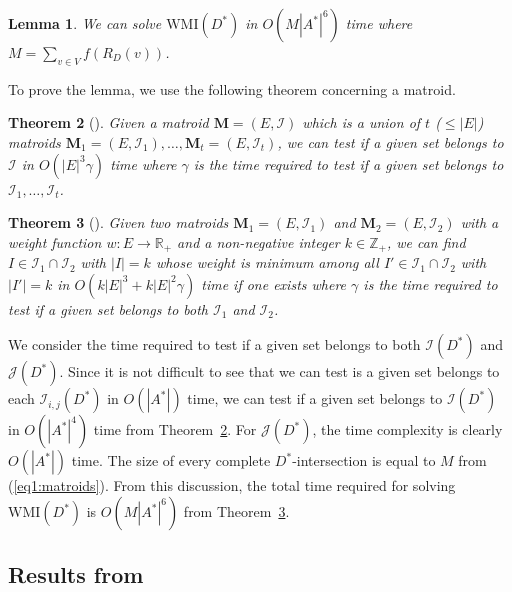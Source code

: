 \documentclass[11pt]{article}
\newcounter{ni}
\theoremstyle{plain}
\newtheorem{theorem}{Theorem}[section]
\newtheorem{lemma}[theorem]{Lemma}\newtheorem{corollary}[theorem]{Corollary}\newtheorem{definition}[theorem]{Definition}\newtheorem{proposition}[theorem]{Proposition}\newtheorem{claim}[theorem]{Claim}\newtheorem{fact}[theorem]{Fact}\newtheorem{example}{Example}
\newcommand{\eop}{\hfill \usebox{\ProofSym}}
\newenvironment{proof}{\noindent {\it Proof.}}{\eop\par\vspace{0.3cm}}
\begin{document}
\begin{lemma} \label{lemma:matroid}
We can solve $\mbox{WMI}(D^{\ast})$ in 
$O(M|A^{\ast}|^6)$ time where $M=\sum_{v \in V}f(R_D(v))$. 
\end{lemma}
\begin{proof}
To prove the lemma, we use the following theorem concerning a matroid. 

\begin{theorem}[\cite{K74}] \label{theorem:matroid-knuth}
Given a matroid $\bm{M}=(E,\mathcal{I})$ 
which is a union of $t$ ($\le |E|$) matroids $\bm{M}_1=(E,\mathcal{I}_1),\ldots,\bm{M}_t=(E,\mathcal{I}_t)$, 
we can test if a given set belongs to 
$\mathcal{I}$ in $O(|E|^3\gamma)$ time where $\gamma$ is the time required 
to test if a given set belongs to $\mathcal{I}_1,\ldots,\mathcal{I}_t$. 
\end{theorem}

\begin{theorem}[\cite{F81}] \label{theorem:matroid-frank}
Given two matroids $\bm{M}_1=(E,\mathcal{I}_1)$ and $\bm{M}_2=(E,\mathcal{I}_2)$ with a weight function 
$w\colon E \to \mathbb{R}_+$ and a non-negative integer $k \in \mathbb{Z}_+$, 
we can find $I\in \mathcal{I}_1\cap \mathcal{I}_2$ with $|I|=k$ whose weight is minimum among all 
$I'\in \mathcal{I}_1 \cap \mathcal{I}_2$ with $|I'|=k$ in $O(k|E|^3 + k|E|^2\gamma)$ time if one 
exists where $\gamma$ is the time required to test if 
a given set belongs to both $\mathcal{I}_1$ and $\mathcal{I}_2$. 
\end{theorem}

We consider the time required to test if a given set 
belongs to both $\mathcal{I}(D^{\ast})$ and $\mathcal{J}(D^{\ast})$. 
Since it is not difficult to see that 
we can test is a given set belongs to each $\mathcal{I}_{i,j}(D^{\ast})$
in $O(|A^{\ast}|)$ time, 
we can test if a given set belongs to $\mathcal{I}(D^{\ast})$ in
$O(|A^{\ast}|^4)$ time from Theorem~\ref{theorem:matroid-knuth}. 
For $\mathcal{J}(D^{\ast})$, the time complexity is clearly $O(|A^{\ast}|)$ time. 
The size of every complete $D^{\ast}$-intersection is equal to 
$M$ from (\ref{eq1:matroids}). 
From this discussion, the total time required for solving $\mbox{WMI}(D^{\ast})$ is $O(M|A^{\ast}|^6)$ from 
Theorem~\ref{theorem:matroid-frank}. 
\end{proof}

\subsection{Results from \cite{KKT08}}
\end{document}
